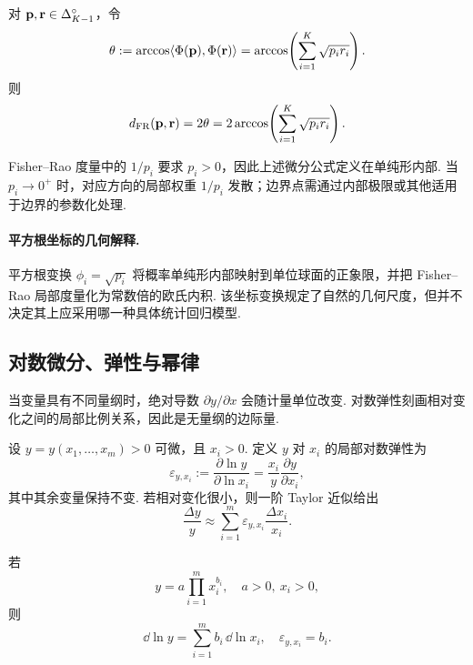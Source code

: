 \begin{corollary}\label{cor:bg-fr-distance}
对 $\mathbf p,\mathbf r\in\Delta_{K-1}^{\circ}$，令
\[
\theta:=\arccos\langle\Phi(\mathbf p),\Phi(\mathbf r)\rangle
=\arccos\!\left(\sum_{i=1}^{K}\sqrt{p_ir_i}\right).
\]
则
\begin{equation}\label{eq:bg-fr-distance}
d_{\mathrm{FR}}(\mathbf p,\mathbf r)=2\theta
=2\arccos\!\left(\sum_{i=1}^{K}\sqrt{p_ir_i}\right).
\end{equation}
\end{corollary}

\begin{remark}
Fisher--Rao 度量中的 $1/p_i$ 要求 $p_i>0$，因此上述微分公式定义在单纯形内部. 当 $p_i\to0^+$ 时，对应方向的局部权重 $1/p_i$ 发散；边界点需通过内部极限或其他适用于边界的参数化处理. 
\end{remark}

\paragraph{平方根坐标的几何解释. \quad}
平方根变换 $\phi_i=\sqrt{p_i}$ 将概率单纯形内部映射到单位球面的正象限，并把 Fisher--Rao 局部度量化为常数倍的欧氏内积. 该坐标变换规定了自然的几何尺度，但并不决定其上应采用哪一种具体统计回归模型. 

\subsection{对数微分、弹性与幂律}\label{sec:bg-elasticity}

当变量具有不同量纲时，绝对导数 $\partial y/\partial x$ 会随计量单位改变. 对数弹性刻画相对变化之间的局部比例关系，因此是无量纲的边际量. 

\begin{definition}[局部对数弹性]\label{def:background-elasticity}
设 $y=y(x_1,\ldots,x_m)>0$ 可微，且 $x_i>0$. 定义 $y$ 对 $x_i$ 的局部对数弹性为
\begin{equation}\label{eq:bg-elasticity}
\varepsilon_{y,x_i}
:=\frac{\partial\ln y}{\partial\ln x_i}
=\frac{x_i}{y}\frac{\partial y}{\partial x_i},
\end{equation}
其中其余变量保持不变. 若相对变化很小，则一阶 Taylor 近似给出
\[
\frac{\Delta y}{y}\approx
\sum_{i=1}^{m}\varepsilon_{y,x_i}\frac{\Delta x_i}{x_i}.
\]
\end{definition}

\begin{proposition}[乘积幂律的对数微分]\label{prop:bg-log-monomial}
若
\[
y=a\prod_{i=1}^{m}x_i^{b_i},\quad a>0,\ x_i>0,
\]
则
\begin{equation}\label{eq:bg-log-monomial}
\dd\ln y=\sum_{i=1}^{m}b_i\,\dd\ln x_i,
\quad
\varepsilon_{y,x_i}=b_i.
\end{equation}
\end{proposition}


